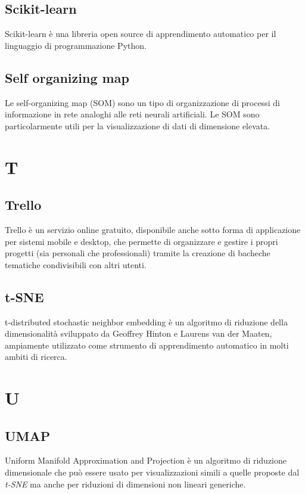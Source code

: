 \subsection{Scikit-learn}
Scikit-learn è una libreria open source di apprendimento automatico per il linguaggio di programmazione Python.

\subsection{Self organizing map}
Le self-organizing map (SOM) sono un tipo di organizzazione di processi di informazione in rete analoghi alle reti neurali artificiali. Le SOM sono particolarmente utili per la visualizzazione di dati di dimensione elevata.

\newpage
\section{T}
\subsection{Trello}
Trello è un servizio online gratuito, disponibile anche sotto forma di applicazione per sistemi mobile e desktop, che permette di organizzare e gestire i propri progetti (sia personali che professionali) tramite la creazione di bacheche tematiche condivisibili con altri utenti.

\subsection{t-SNE}
t-distributed stochastic neighbor embedding è un algoritmo di riduzione della dimensionalità sviluppato da Geoffrey Hinton e Laurens van der Maaten, ampiamente utilizzato come strumento di apprendimento automatico in molti ambiti di ricerca.

\newpage
\section{U}
\subsection{UMAP}
Uniform Manifold Approximation and Projection è un algoritmo di riduzione dimensionale che può essere usato per visualizzazioni simili a quelle proposte dal \textit{t-SNE} ma anche per  riduzioni di dimensioni non lineari generiche.


